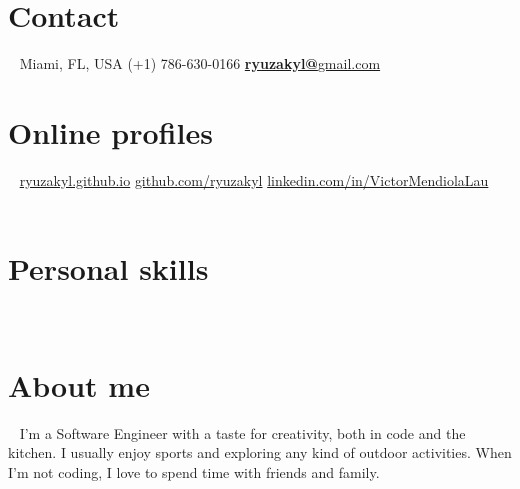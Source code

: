 \documentclass[]{friggeri-cv}
\begin{document}


\begin{aside}
  \section{Contact}
  	~
    Miami, FL, USA
    (+1) 786-630-0166
    \href{mailto:ryuzakyl@gmail.com}{\textbf{ryuzakyl@}gmail.com}
    ~
    ~
    ~
  \section{Online profiles}
  	~
    \href{https://ryuzakyl.github.io}{{\scriptsize ryuzakyl.github.io}}
    \href{https://github.com/ryuzakyl}{{\scriptsize github.com/ryuzakyl}}
    \href{https://www.linkedin.com/in/victormendiolalau}{{\scriptsize linkedin.com/in/VictorMendiolaLau}}
    ~
    ~
    ~
  \section{Personal skills}
    ~
	~
	~
	~
  \section{About me}
    ~
    I'm a Software Engineer with a taste for creativity, both in code and the kitchen. I usually enjoy sports and exploring any kind of outdoor activities. When I'm not coding, I love to spend time with friends and family.
\end{aside}
\end{document}
